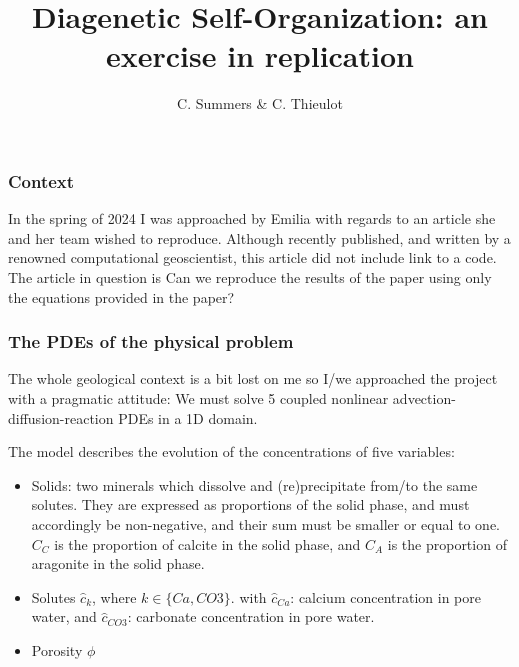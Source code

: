 \documentclass[a4paper]{article}
\title{Diagenetic Self-Organization: an exercise in replication}
\author{C. Summers \& C. Thieulot}
\begin{document}
\maketitle


\subsubsection*{Context}

In the spring of 2024 I was approached by Emilia with regards to an article she and 
her team wished to reproduce. Although recently published, and written by a renowned computational
geoscientist, this article did not include link to a code. 
The article in question is \cite{lheu18} 
Can we reproduce the results of the paper using only the equations provided in the paper?

\subsubsection*{The PDEs of the physical problem}

The whole geological context is a bit lost on me so I/we approached the project with a pragmatic 
attitude: We must solve 5 coupled nonlinear advection-diffusion-reaction PDEs in a 1D domain.

The model describes the evolution of the concentrations of five variables:
\begin{itemize}
\item Solids: two minerals which dissolve and (re)precipitate from/to the same
solutes. They are expressed as proportions of the solid phase, and must
accordingly be non-negative, and their sum must be smaller or equal to one.
$C_C$ is the proportion of calcite in the solid phase, and $C_A$ is the 
proportion of aragonite in the solid phase.

\item Solutes $\hat{c}_k$, where $k \in \{ Ca,CO3\}$.
with $\hat{c}_{Ca}$: calcium concentration in pore water, and
$\hat{c}_{CO3}$: carbonate concentration in pore water.

\item Porosity $\phi$
\end{itemize}
\end{document}
